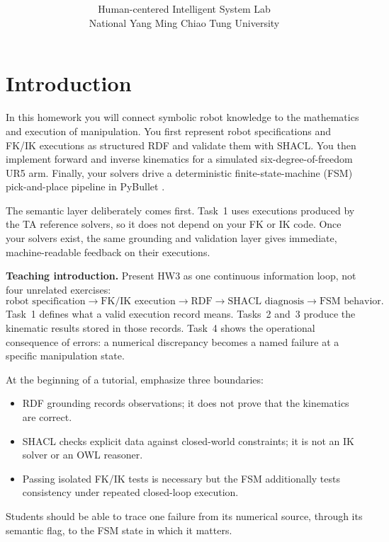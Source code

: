 \documentclass[11pt]{article}
\title{\textbf{\AssignmentTitle}}
\author{Human-centered Intelligent System Lab\\National Yang Ming Chiao Tung University}
\date{\Semester}
\newif\iftutornotes
\newcommand{\EditionLabel}{\iftutornotes
  \begin{center}\small\color{tutorblue}TA / Tutor Teaching Edition\end{center}\fi}
\begin{document}
\maketitle
\EditionLabel

\section*{Introduction}

In this homework you will connect symbolic robot knowledge to the mathematics
and execution of manipulation. You first represent robot specifications and
FK/IK executions as structured RDF and validate them with SHACL. You then
implement forward and inverse kinematics for a simulated six-degree-of-freedom
UR5 arm. Finally, your solvers drive a deterministic finite-state-machine
(FSM) pick-and-place pipeline in PyBullet \cite{coumans2021pybullet}.

The semantic layer deliberately comes first. Task~1 uses executions produced
by the TA reference solvers, so it does not depend on your FK or IK code. Once
your solvers exist, the same grounding and validation layer gives immediate,
machine-readable feedback on their executions.

\begin{tutornote}
\textbf{Teaching introduction.} Present HW3 as one continuous information
loop, not four unrelated exercises:
\[
\text{robot specification}\rightarrow\text{FK/IK execution}
\rightarrow\text{RDF}\rightarrow\text{SHACL diagnosis}
\rightarrow\text{FSM behavior}.
\]
Task~1 defines what a valid execution record means. Tasks~2 and~3 produce the
kinematic results stored in those records. Task~4 shows the operational
consequence of errors: a numerical discrepancy becomes a named failure at a
specific manipulation state.

At the beginning of a tutorial, emphasize three boundaries:
\begin{itemize}
  \item RDF grounding records observations; it does not prove that the
    kinematics are correct.
  \item SHACL checks explicit data against closed-world constraints; it is not
    an IK solver or an OWL reasoner.
  \item Passing isolated FK/IK tests is necessary but the FSM additionally
    tests consistency under repeated closed-loop execution.
\end{itemize}
Students should be able to trace one failure from its numerical source, through
its semantic flag, to the FSM state in which it matters.
\end{tutornote}
\end{document}
